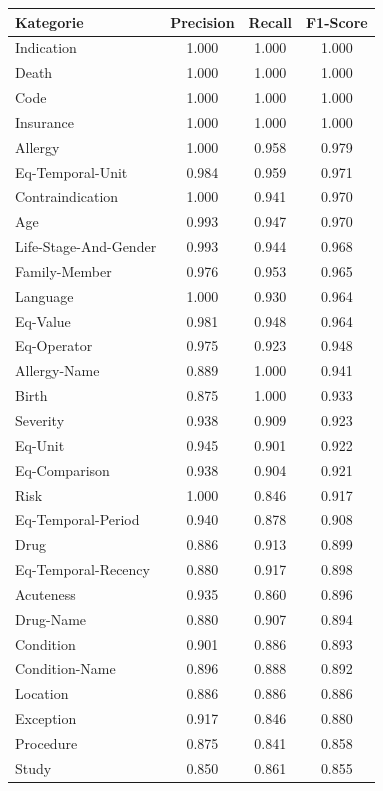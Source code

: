 \begin{table}[htbp]
\centering
\begin{tabular}{p{5cm}ccc}
\toprule
\textbf{Kategorie} & \textbf{Precision} & \textbf{Recall} & \textbf{F1-Score} \\
\midrule
Indication & 1.000 & 1.000 & 1.000 \\
Death & 1.000 & 1.000 & 1.000 \\
Code & 1.000 & 1.000 & 1.000 \\
Insurance & 1.000 & 1.000 & 1.000 \\
Allergy & 1.000 & 0.958 & 0.979 \\
Eq-Temporal-Unit & 0.984 & 0.959 & 0.971 \\
Contraindication & 1.000 & 0.941 & 0.970 \\
Age & 0.993 & 0.947 & 0.970 \\
Life-Stage-And-Gender & 0.993 & 0.944 & 0.968 \\
Family-Member & 0.976 & 0.953 & 0.965 \\
Language & 1.000 & 0.930 & 0.964 \\
Eq-Value & 0.981 & 0.948 & 0.964 \\
Eq-Operator & 0.975 & 0.923 & 0.948 \\
Allergy-Name & 0.889 & 1.000 & 0.941 \\
Birth & 0.875 & 1.000 & 0.933 \\
Severity & 0.938 & 0.909 & 0.923 \\
Eq-Unit & 0.945 & 0.901 & 0.922 \\
Eq-Comparison & 0.938 & 0.904 & 0.921 \\
Risk & 1.000 & 0.846 & 0.917 \\
Eq-Temporal-Period & 0.940 & 0.878 & 0.908 \\
Drug & 0.886 & 0.913 & 0.899 \\
Eq-Temporal-Recency & 0.880 & 0.917 & 0.898 \\
Acuteness & 0.935 & 0.860 & 0.896 \\
Drug-Name & 0.880 & 0.907 & 0.894 \\
Condition & 0.901 & 0.886 & 0.893 \\
Condition-Name & 0.896 & 0.888 & 0.892 \\
Location & 0.886 & 0.886 & 0.886 \\
Exception & 0.917 & 0.846 & 0.880 \\
Procedure & 0.875 & 0.841 & 0.858 \\
Study & 0.850 & 0.861 & 0.855 \\

\end{tabular}
\end{table}
